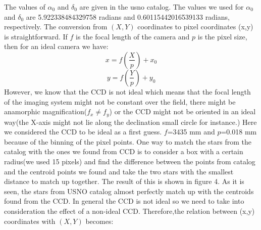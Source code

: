 \documentclass[letterpaper,12pt]{article}
\begin{document}
The values of \begin{math} \alpha_{0} \end{math} and \begin{math} \delta_{0} \end{math} are given in the usno catalog.
The values we used for  \begin{math} \alpha_{0} \end{math} and \begin{math} \delta_{0} \end{math} are  5.922338484329758 radians and 0.60115442016539133 radians, respectively. 
The conversion from \begin{math}(X,Y) \end{math} coordinates to pixel coordinates (x,y) is straightforward. If \begin{math} f \end{math} is the focal length of the camera and \begin{math} p \end{math} is the pixel size, then for an ideal camera we have:
\begin{equation}
x=f(\frac{X}{p})+x_{0}
\end{equation}
\begin{equation}
y=f(\frac{Y}{p})+y_{0}
\end{equation}
However, we know that the CCD is not ideal which means that the focal length of the imaging system might not be constant over the field, there might be anamorphic magnification(\begin{math} f_{x}\neq f_{y} \end{math}) or the CCD might not be oriented in an ideal way(the X-axis might not lie along the declination small circle for instance.)
Here we considered the CCD to be ideal as a first guess. \begin{math} f \end{math}=3435 mm and \begin{math} p \end{math}=0.018 mm because of the binning of the pixel points. One way to match the stars from the catalog with the ones we found from CCD is to consider a box with a certain radius(we used 15 pixels) and find the difference between the points from catalog and the centroid points we found and take the two stars with the smallest distance to match up together. The result of this is shown in figure 4. As it is seen, the stars from USNO catalog almost perfectly match up with the centroids found from the CCD. 
In general the CCD is not ideal so we need to take into consideration the effect of a non-ideal CCD. Therefore,the relation between (x,y) coordinates with  \begin{math} (X,Y) \end{math} becomes:
\end{document}
